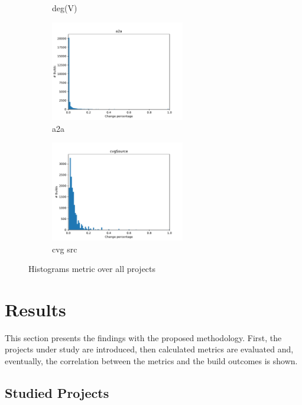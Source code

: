 \documentclass[sigplan, anonymous, review]{acmart}
\begin{document}
\begin{figure}[!t]
\begin{subfigure}{2.3in}
		\caption{deg(V)}
		\label{nodDegHist}
	\end{subfigure}%
	\begin{subfigure}{2.3in}
		\centering
		\includegraphics[width=2.3in]{assets/a2a.pdf}
		\caption{a2a}
		\label{a2aHist}
	\end{subfigure}%
	\begin{subfigure}{2.3in}
		\centering
		\includegraphics[width=2.3in]{assets/cvgSource.pdf}
		\caption{cvg src}
		\label{cvgHist}
	\end{subfigure}
	\caption{Histograms metric over all projects}
	\label{fig:histograms}
	
\end{figure}

\section{Results}

This section presents the findings with the proposed methodology. First, the projects under study are introduced, then calculated metrics are evaluated and, eventually, the correlation between the metrics and the build outcomes is shown.

\subsection{Studied Projects}
\end{document}

